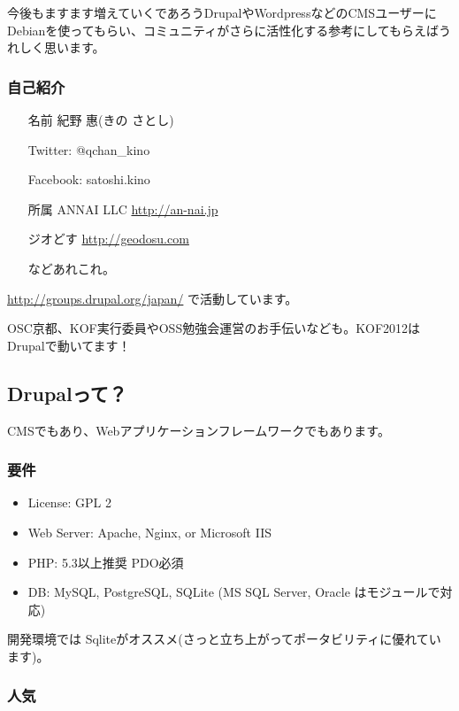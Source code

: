 \documentclass[mingoth,a4paper]{jsarticle}
\begin{document}
今後もますます増えていくであろうDrupalやWordpressなどのCMSユーザーにDebianを使ってもらい、コミュニティがさらに活性化する参考にしてもらえばうれしく思います。

\subsubsection{自己紹介}
\begin{itemize}
\item[名前] 紀野 惠(きの さとし)

  Twitter: @qchan\_kino

  Facebook: satoshi.kino

\item[所属] ANNAI LLC \url{http://an-nai.jp}

  ジオどす \url{http://geodosu.com}

  などあれこれ。
\end{itemize}

\url{http://groups.drupal.org/japan/} で活動しています。

OSC京都、KOF実行委員やOSS勉強会運営のお手伝いなども。KOF2012はDrupalで動いてます！

\clearpage

\subsection{Drupalって？}
CMSでもあり、Webアプリケーションフレームワークでもあります。

\subsubsection{要件}
\begin{itemize}
\item License: GPL 2
\item Web Server: Apache, Nginx, or Microsoft IIS
\item PHP: 5.3以上推奨  PDO必須
\item DB: MySQL, PostgreSQL, SQLite
  (MS SQL Server, Oracle はモジュールで対応)

\cite{requirements}
\end{itemize}

開発環境では Sqliteがオススメ(さっと立ち上がってポータビリティに優れています)。

\subsubsection{人気}
\end{document}
